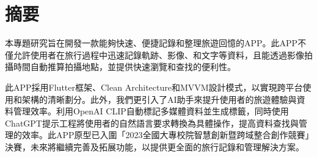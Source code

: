 \section{摘要}



本專題研究旨在開發一款能夠快速、便捷記錄和整理旅遊回憶的APP。此APP不僅允許使用者在旅行過程中迅速記錄軌跡、影像、和文字等資料，且能透過影像拍攝時間自動推算拍攝地點，並提供快速瀏覽和查找的便利性。

此APP採用Flutter框架、Clean Architecture和MVVM設計模式，以實現跨平台使用和架構的清晰劃分。此外，我們更引入了AI助手來提升使用者的旅遊體驗與資料管理效率。利用OpenAI CLIP自動標記多媒體資料並生成標籤，同時使用ChatGPT提示工程將使用者的自然語言要求轉換為具體操作，提高資料查找與管理的效率。此APP原型已入圍「2023全國大專校院智慧創新暨跨域整合創作競賽」決賽，未來將繼續完善及拓展功能，以提供更全面的旅行記錄和管理解決方案。